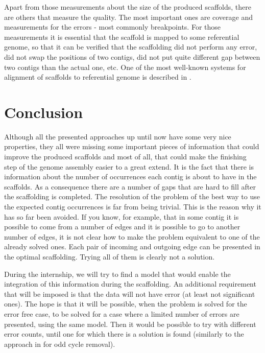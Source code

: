 \documentclass[11pt]{article}
\begin{document}
Apart from those measurements about the size of the produced scaffolds, there
are others that measure the quality. The most important ones are coverage and
measurements for the errors - most commonly breakpoints. For those measurements
it is essential that the scaffold is mapped to some referential genome, so that
it can be verified that the scaffolding did not perform any error, did not swap
the positions of two contigs, did not put quite different gap between two
contigs than the actual one, etc. One of the most well-known systems for
alignment of scaffolds to referential genome is described in \cite{MUMmer}. 

\section{Conclusion} %
\label{sec:Conclusion}
Although all the presented approaches up until now have some very nice
properties, they all were missing some important pieces of information that
could improve the produced scaffolds and most of all, that could make the
finishing step of the genome assembly easier to a great extend. It is the fact
that there is information about the number of occurrences each contig is about
to have in the scaffolds. As a consequence there are a number of gaps that are
hard to fill after the scaffolding is completed. The resolution of the problem
of the best way to use the expected contig occurrences is far from being
trivial. This is the reason why it has so far been avoided. If you know, for
example, that in some contig it is possible to come from a number of edges and
it is possible to go to another number of edges, it is not clear how to make the
problem equivalent to one of the already solved ones. Each pair of incoming and
outgoing edge can be presented in the optimal scaffolding. Trying all of them is
clearly not a solution.

During the internship, we will try to find a model that would enable the
integration of this information during the scaffolding. An additional
requirement that will be imposed is that the data will not have error (at least
not significant ones). The hope is that it will be possible, when the problem is
solved for the error free case, to be solved for a case where a limited number
of errors are presented, using the same model. Then it would be possible to try
with different error counts, until one for which there is a solution is found
(similarly to the approach in \cite{SCARPA} for odd cycle removal).
\end{document}
